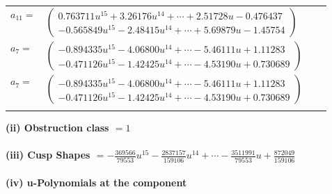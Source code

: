 \documentclass[1p]{elsarticle_modified}
\theoremstyle{definition}
\begin{document}
\begin{tabular}{m{7pt} m{180pt} m{7pt} m{180pt} }
\flushright $a_{11}=$&$\begin{pmatrix}0.763711 u^{15}+3.26176 u^{14}+\cdots+2.51728 u-0.476437\\-0.565849 u^{15}-2.48415 u^{14}+\cdots+5.69879 u-1.45754\end{pmatrix}$ \\
\flushright $a_{7}=$&$\begin{pmatrix}-0.894335 u^{15}-4.06800 u^{14}+\cdots-5.46111 u+1.11283\\-0.471126 u^{15}-1.42425 u^{14}+\cdots-4.53190 u+0.730689\end{pmatrix}$\\ \flushright $a_{7}=$&$\begin{pmatrix}-0.894335 u^{15}-4.06800 u^{14}+\cdots-5.46111 u+1.11283\\-0.471126 u^{15}-1.42425 u^{14}+\cdots-4.53190 u+0.730689\end{pmatrix}$\\&\end{tabular}
\flushleft \textbf{(ii) Obstruction class $= 1$}\\~\\
\flushleft \textbf{(iii) Cusp Shapes $= -\frac{369566}{79553} u^{15}-\frac{2837157}{159106} u^{14}+\cdots-\frac{3511991}{79553} u+\frac{872049}{159106}$}\\~\\
\newpage\renewcommand{\arraystretch}{1}
\flushleft \textbf{(iv) u-Polynomials at the component}\newline \\
\end{document}
